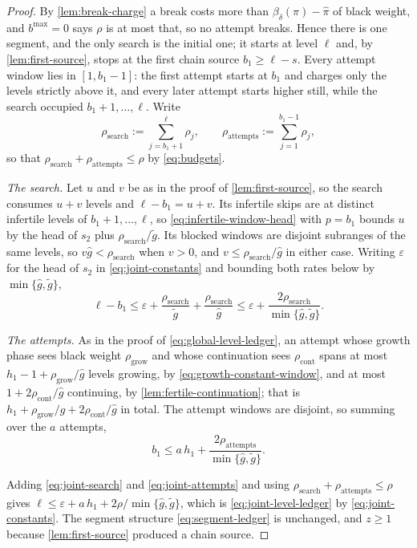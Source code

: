 \documentclass[11pt]{article}
\theoremstyle{plain}
\theoremstyle{remark}
\newcommand{\ghat}{\widehat g}
\newcommand{\gtilde}{\widetilde g}
\newcommand{\pihat}{\widehat{\pi}}
\newcommand{\spend}[2]{\sum_{j=#1}^{#2}\rho_j}
\begin{document}
\begin{proof}
By \cref{lem:break-charge} a break costs more than \(\beta_\delta(\pi)-\pihat\) of
black weight, and \(b^{\max}=0\) says \(\rho\) is at most that, so no attempt breaks.
Hence there is one segment, and the only search is the initial one; it starts at level
\(\ell\) and, by \cref{lem:first-source}, stops at the first chain source
\(b_1\ge\ell-s\).  Every attempt window lies in \([1,b_1-1]\): the first attempt starts at
\(b_1\) and charges only the levels strictly above it, and every later attempt starts
higher still, while the search occupied \(b_1+1,\ldots,\ell\).  Write
\[
 \rho_{\mathrm{search}}:=\spend{b_1+1}{\ell},\qquad
 \rho_{\mathrm{attempts}}:=\spend{1}{b_1-1},
\]
so that \(\rho_{\mathrm{search}}+\rho_{\mathrm{attempts}}\le\rho\) by
\eqref{eq:budgets}.

\emph{The search.}  Let \(u\) and \(v\) be as in the proof of
\cref{lem:first-source}, so the search consumes \(u+v\) levels and
\(\ell-b_1=u+v\).  Its infertile skips are at distinct infertile levels of
\(b_1+1,\ldots,\ell\), so \eqref{eq:infertile-window-head} with \(p=b_1\) bounds \(u\) by the head of \(s_2\)
plus \(\rho_{\mathrm{search}}/\gtilde\).  Its blocked windows are disjoint subranges
of the same levels, so \(v\ghat<\rho_{\mathrm{search}}\) when \(v>0\), and
\(v\le \rho_{\mathrm{search}}/\ghat\) in either case.  Writing \(\varepsilon\) for
the head of \(s_2\) in
\eqref{eq:joint-constants} and bounding both rates below by
\(\min\{\ghat,\gtilde\}\),
\begin{equation}
 \ell-b_1\le\varepsilon
   +\frac{\rho_{\mathrm{search}}}{\gtilde}
   +\frac{\rho_{\mathrm{search}}}{\ghat}
 \le\varepsilon
   +\frac{2\rho_{\mathrm{search}}}{\min\{\ghat,\gtilde\}} .
 \label{eq:joint-search}
\end{equation}

\emph{The attempts.}  As in the proof of \eqref{eq:global-level-ledger}, an attempt
whose growth phase sees black weight \(\rho_{\mathrm{grow}}\) and whose continuation
sees \(\rho_{\mathrm{cont}}\) spans at most
\(h_1-1+\rho_{\mathrm{grow}}/\ghat\) levels growing, by
\eqref{eq:growth-constant-window}, and at most
\(1+2\rho_{\mathrm{cont}}/\ghat\) continuing, by
\cref{lem:fertile-continuation}; that is
\(h_1+\rho_{\mathrm{grow}}/\ghat+2\rho_{\mathrm{cont}}/\ghat\) in total.  The
attempt windows are disjoint, so summing over the \(a\) attempts,
\begin{equation}
 b_1\le a\,h_1
   +\frac{2\rho_{\mathrm{attempts}}}{\min\{\ghat,\gtilde\}} .
 \label{eq:joint-attempts}
\end{equation}

Adding \eqref{eq:joint-search} and \eqref{eq:joint-attempts} and using
\(\rho_{\mathrm{search}}+\rho_{\mathrm{attempts}}\le\rho\) gives
\(\ell\le\varepsilon+a\,h_1+2\rho/\min\{\ghat,\gtilde\}\), which is
\eqref{eq:joint-level-ledger} by \eqref{eq:joint-constants}.  The segment
structure \eqref{eq:segment-ledger} is unchanged, and \(z\ge1\) because
\cref{lem:first-source} produced a chain source.
\end{proof}
\end{document}
